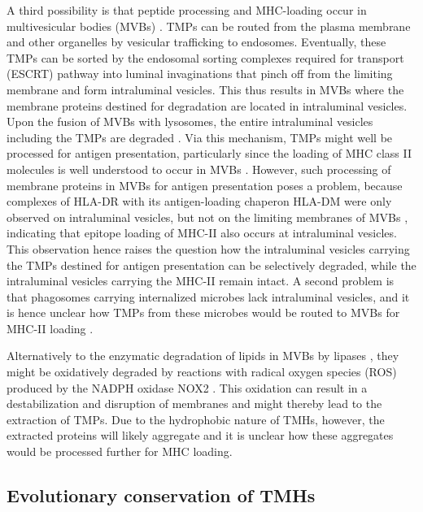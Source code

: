 A third possibility is that peptide processing and MHC-loading occur in multivesicular bodies (MVBs) \cite{oliveira2015alternative}. 
TMPs can be routed from the plasma membrane and other organelles by vesicular trafficking to endosomes. Eventually, these TMPs can be sorted by the endosomal sorting complexes required for transport (ESCRT) pathway into luminal invaginations that pinch off from the limiting membrane and form intraluminal vesicles. This thus results in MVBs where the membrane proteins destined for degradation are located in intraluminal vesicles. Upon the fusion of MVBs with lysosomes, 
the entire intraluminal vesicles including the TMPs are degraded \cite{gruenberg2020life}. 
Via this mechanism, TMPs might well be processed for antigen presentation, 
particularly since the loading of MHC class II molecules is well understood 
to occur in MVBs \cite{kleijmeer2001reorganization,peters1991segregation,zwart2005spatial}. 
However, such processing of membrane proteins in MVBs for antigen presentation poses a problem, because complexes of HLA-DR with its antigen-loading chaperon HLA-DM were only observed on intraluminal vesicles, 
but not on the limiting membranes of MVBs \cite{zwart2005spatial}, 
indicating that epitope loading of MHC-II also occurs at intraluminal vesicles. This observation hence raises the question how the intraluminal vesicles carrying the TMPs destined for antigen presentation can be selectively degraded, while the intraluminal vesicles carrying the MHC-II remain intact. A second problem is that phagosomes carrying internalized microbes lack intraluminal vesicles, 
and it is hence unclear how TMPs from these microbes 
would be routed to MVBs for MHC-II loading \cite{zwart2005spatial}.

Alternatively to the enzymatic degradation of lipids in MVBs by lipases \cite{sander2016lipase,gilleron2016lysosomal}, 
they might be oxidatively degraded by reactions with radical oxygen species (ROS) produced by the NADPH oxidase NOX2 \cite{dingjan2016lipid}. 
This oxidation can result in a destabilization and disruption of membranes \cite{dingjan2016lipid} 
and might thereby lead to the extraction of TMPs. 
Due to the hydrophobic nature of TMHs, 
however, the extracted proteins will likely aggregate 
and it is unclear how these aggregates would be processed further for MHC loading. 


\subsection{Evolutionary conservation of TMHs}


